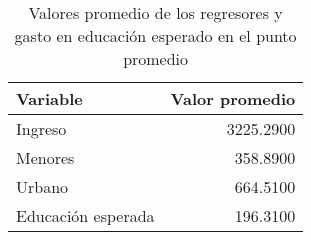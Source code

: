 \begin{table}[H]
    \centering
    \color{blue}
    \caption{Valores promedio de los regresores y gasto en educación esperado en el punto promedio}
    \label{tab:prediccion_media}
    \begin{tabular}{lr}
        \toprule
        Variable & Valor promedio \\
        \midrule
        Ingreso              & 3225.2900 \\
        Menores              &  358.8900 \\
        Urbano               &  664.5100 \\
        Educación esperada   &  196.3100 \\
        \bottomrule
    \end{tabular}
\end{table}

